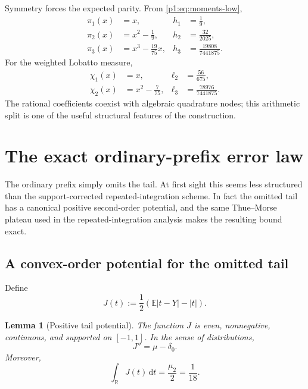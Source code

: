\documentclass[11pt]{article}
\numberwithin{equation}{section}
\newtheorem{lemma}[theorem]{Lemma}
\theoremstyle{definition}
\theoremstyle{remark}
\newcommand{\R}{\mathbb R}
\newcommand{\E}{\mathbb E}
\newcommand{\dd}{\,\mathrm d}
\newcommand{\abs}[1]{\left|#1\right|}
\begin{document}
Symmetry forces the expected parity.  From \eqref{p1:eq:moments-low},
\begin{align}
 \pi_1(x)&=x,& h_1&=\frac19,\label{p1:eq:pi1}\\
 \pi_2(x)&=x^2-\frac19,& h_2&=\frac{32}{2025},\label{p1:eq:pi2}\\
 \pi_3(x)&=x^3-\frac{19}{75}x,& h_3&=\frac{19808}{7441875}.
 \label{p1:eq:pi3}
\end{align}
For the weighted Lobatto measure,
\begin{align}
 \chi_1(x)&=x,& \ell_2&=\frac{56}{675},\label{p1:eq:chi1}\\
 \chi_2(x)&=x^2-\frac7{75},& \ell_3&=\frac{78976}{7441875}.
 \label{p1:eq:chi2}
\end{align}
The rational coefficients coexist with algebraic quadrature nodes; this arithmetic split is one of the useful structural features of the construction.

\section{The exact ordinary-prefix error law}
\label{p1:sec:ordinary}

The ordinary prefix simply omits the tail.  At first sight this seems less structured than the support-corrected repeated-integration scheme.  In fact the omitted tail has a canonical positive second-order potential, and the same Thue--Morse plateau used in the repeated-integration analysis makes the resulting bound exact.

\subsection{A convex-order potential for the omitted tail}

Define
\begin{equation}
 J(t):=\frac12\left(\E\abs{t-Y}-\abs t\right).
 \label{p1:eq:J-def}
\end{equation}

\begin{lemma}[Positive tail potential]
\label{p1:lem:J}
The function $J$ is even, nonnegative, continuous, and supported on $[-1,1]$.  In the sense of distributions,
\begin{equation}
 J''=\mu-\delta_0.
 \label{p1:eq:J-second}
\end{equation}
Moreover,
\begin{equation}
 \int_{\R}J(t)\dd t=\frac{\mu_2}{2}=\frac1{18}.
 \label{p1:eq:J-mass}
\end{equation}
\end{lemma}
\end{document}
